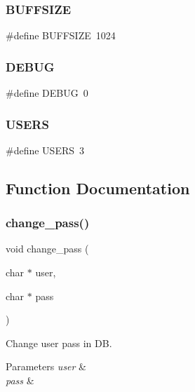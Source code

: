 \subsubsection{B\+U\+F\+F\+S\+I\+ZE}
{\footnotesize\ttfamily \#define B\+U\+F\+F\+S\+I\+ZE~1024}

\mbox{\label{auth_8h_ad72dbcf6d0153db1b8d8a58001feed83}} 
\subsubsection{D\+E\+B\+UG}
{\footnotesize\ttfamily \#define D\+E\+B\+UG~0}

\mbox{\label{auth_8h_a322789c10f93ef5e09a1d5f17aabf0e3}} 
\subsubsection{U\+S\+E\+RS}
{\footnotesize\ttfamily \#define U\+S\+E\+RS~3}



\subsection{Function Documentation}
\mbox{\label{auth_8h_a97aeb8e1fb29fa958c8ea862bda5ba69}} 
\subsubsection{change\+\_\+pass()}
{\footnotesize\ttfamily void change\+\_\+pass (\begin{DoxyParamCaption}\item[{char $\ast$}]{user,  }\item[{char $\ast$}]{pass }\end{DoxyParamCaption})}



Change user pass in DB. 


\begin{DoxyParams}{Parameters}
{\em user} & \\
\hline
{\em pass} & \\
\hline
\end{DoxyParams}
\mbox{\label{auth_8h_a6115e4f2f17d1ecbd69a148fbc06b830}} 
